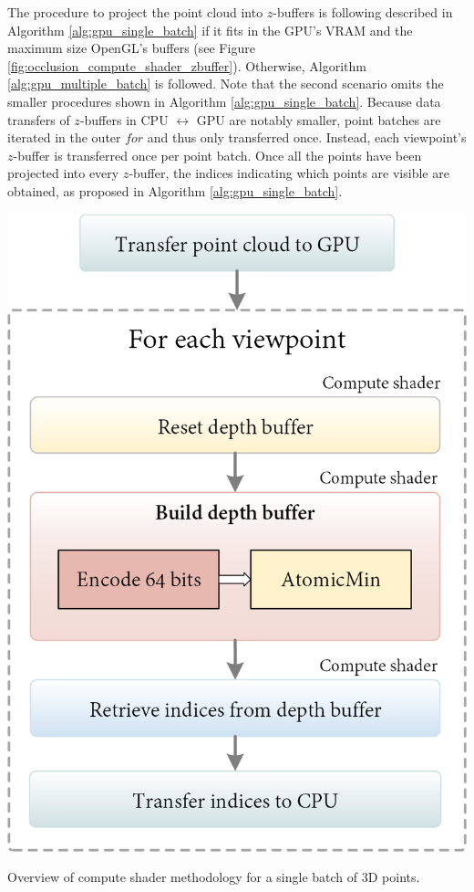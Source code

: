 The procedure to project the point cloud into $z$-buffers is following described in Algorithm \ref{alg:gpu_single_batch} if it fits in the GPU's VRAM and the maximum size OpenGL's buffers (see Figure \ref{fig:occlusion_compute_shader_zbuffer}). Otherwise, Algorithm \ref{alg:gpu_multiple_batch} is followed. Note that the second scenario omits the smaller procedures shown in Algorithm \ref{alg:gpu_single_batch}. Because data transfers of $z$-buffers in CPU $\leftrightarrow$ GPU are notably smaller, point batches are iterated in the outer $\textit{for}$ and thus only transferred once. Instead, each viewpoint's $z$-buffer is transferred once per point batch. Once all the points have been projected into every $z$-buffer, the indices indicating which points are visible are obtained, as proposed in Algorithm \ref{alg:gpu_single_batch}.
\begin{marginfigure}[.3cm]
    \includegraphics[width=\linewidth]{figs/multi_thermal_projection/occlusion_compute_shader.png}
    \caption{Overview of compute shader methodology for a single batch of 3D points.}
    \label{fig:occlusion_compute_shader_zbuffer}
\end{marginfigure}

